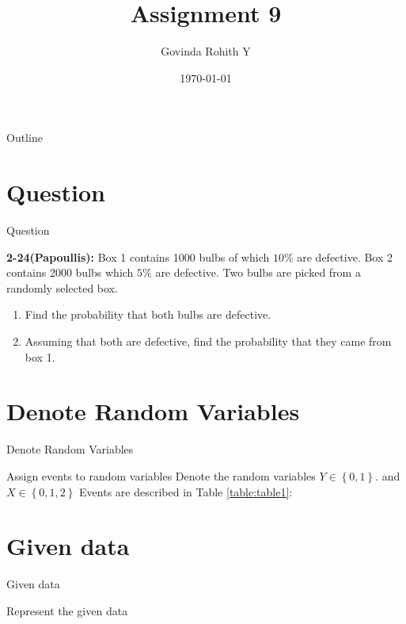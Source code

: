 \documentclass{beamer}
\title{Assignment 9}
\author{Govinda Rohith Y}
\date{\today}
\providecommand{\cbrak}[1]{\ensuremath{\left\{#1\right\}}}
\begin{document}
\begin{frame}
    \titlepage 
\end{frame}

\logo{}


\begin{frame}{Outline}
    \tableofcontents
\end{frame}


\section{Question}
\begin{frame}{Question}

\begin{block}{\textbf{2-24(Papoullis):}}
        Box 1 contains 1000 bulbs of which $10\%$ are defective. Box 2 contains 2000 bulbs which $5\%$ are defective. Two bulbs are picked from a randomly selected box.
\begin{enumerate}[label=(\alph*)]
    \item Find the probability that both bulbs are defective.
    \item Assuming that both are defective, find the probability that they came from box 1.
\end{enumerate}
    \end{block}

\end{frame}


\section{Denote Random Variables}
\begin{frame}{Denote Random Variables}
    \begin{block}{Assign events to random variables}
   Denote the random variables $Y\in \cbrak{0,1}$. and $X\in \cbrak{0,1,2}$ Events are described in Table \ref{table:table1}:
    \end{block}
    \begin{table}[h!]
	
	\caption{}
    \label{table:table1}
    \end{table}
     
     \end{frame} 
     \section{Given data}
     \begin{frame}{Given data}
\begin{block}{Represent the given data}

\end{block}
\begin{table}[h!]
	
	\caption{}
    \label{table:table2}
    \end{table}
\end{frame} 
\end{document}
